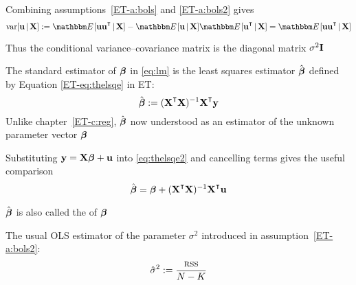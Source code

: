 \begin{frame}

    \vspace{2em}
    Combining assumptions~\ref{ET-a:bols} and \ref{ET-a:bols2} gives
    \begin{equation*}
        \var [ \boldu  \given \boldX ] 
        := \EE [ \boldu \boldu^\T \given \boldX ]
                -  \EE [ \boldu \given \boldX ] \EE [ \boldu^\T \given \boldX ]
        = \EE [ \boldu \boldu^\T \given \boldX ]
    \end{equation*}
    
    \vspace{.7em}
    Thus the conditional variance--covariance matrix is the diagonal
    matrix $\sigma^2 \mathbf I$

\end{frame}


\begin{frame}
    
    \vspace{2em}
    The standard estimator of ${\boldsymbol \beta}$ in \eqref{eq:lm} is
    the least squares estimator $\hat {\boldsymbol \beta}$ defined by Equation \eqref{ET-eq:thelsqe} in ET:
    \begin{equation}
        \label{eq:thelsqe2}
        \hboldbeta := (\boldX^\T \boldX)^{-1} \boldX^\T \boldy
    \end{equation}
    Unlike chapter~\ref{ET-c:reg}, $\hat {\boldsymbol \beta}$ now understood as an 
    estimator of the unknown parameter vector ${\boldsymbol \beta}$
    
    
    \vspace{.7em}
    Substituting ${\mathbf y} = \mathbf X {\boldsymbol \beta} + {\mathbf u}$ into \eqref{eq:thelsqe2} and
    cancelling terms gives the useful comparison
    \begin{equation}
        \label{eq:hg}
        \hboldbeta = 
        \boldbeta + (\boldX^\T \boldX)^{-1} \boldX^\T \boldu 
    \end{equation}
    
\end{frame}

\begin{frame}
    
    \vspace{2em}
    $\hat {\boldsymbol \beta}$ is also called
    the  of ${\boldsymbol \beta}$
    
    \vspace{.7em}
    The usual OLS estimator of the parameter $\sigma^2$ introduced in
    assumption~\ref{ET-a:bols2}:
    \begin{equation}
        \label{eq:hatsig}
        \hat \sigma^2 := \frac{\textrm{{\sc rss}}}{N - K}
    \end{equation}

\end{frame}

